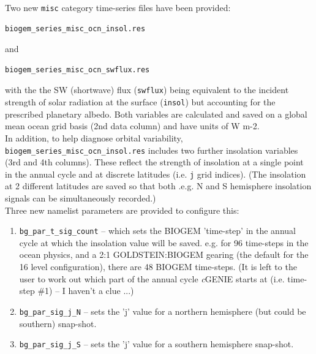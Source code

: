\documentclass[11pt,fleqn]{book} %
\begin{document}
\vspace{1mm}
Two new \texttt{misc} category time-series files have been provided:
\vspace{-1mm}\begin{verbatim}biogem_series_misc_ocn_insol.res\end{verbatim}\vspace{-1mm}
and
\vspace{-1mm}\begin{verbatim}biogem_series_misc_ocn_swflux.res\end{verbatim}\vspace{-1mm}
with the the SW (shortwave) flux (\texttt{swflux}) being equivalent to the incident strength of solar radiation at the surface (\texttt{insol}) but accounting for the prescribed planetary albedo. Both variables are calculated and saved on a global mean ocean grid basis (2nd data column) and have units of W m-2.
\\In addition, to help diagnose orbital variability, \texttt{biogem\_series\_misc\_ocn\_insol.res} includes two further insolation variables (3rd and 4th columns). These reflect the strength of insolation at a single point in the annual cycle and at discrete latitudes (i.e. \texttt{j} grid indices). (The insolation at 2 different latitudes are saved so that both .e.g. N and S hemisphere insolation signals can be simultaneously recorded.)
\\Three new namelist parameters are provided to configure this:

\begin{enumerate}[noitemsep]

\item \texttt{bg\_par\_t\_sig\_count} -- which sets the BIOGEM 'time-step' in the annual cycle at which the insolation value will be saved. e.g. for 96 time-steps in the ocean physics, and a 2:1 GOLDSTEIN:BIOGEM gearing (the default for the 16 level configuration), there are 48 BIOGEM time-steps. (It is left to the user to work out which part of the annual cycle \textit{c}GENIE starts at (i.e. time-step \#1) -- I haven't a clue ...)

\item \texttt{bg\_par\_sig\_j\_N} -- sets the 'j' value for a northern hemisphere (but could be southern) snap-shot.

\item \texttt{bg\_par\_sig\_j\_S} -- sets the 'j' value for a southern hemisphere snap-shot.

\end{enumerate}
\end{document}
